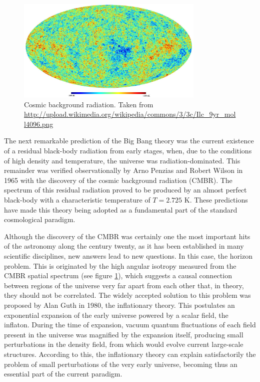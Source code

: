\
\begin{figure}[htbp]
	\centering
	\includegraphics[width=0.8\textwidth]
	{./figures/1_introduction/CMB.png}
	
	\caption{\small{Cosmic background radiation. Taken from 
	\url{http://upload.wikimedia.org/wikipedia/commons/3/3c/Ilc_9yr_moll4096.png}}}
	
	\label{fig:CMB}
\end{figure}


The next remarkable prediction of the Big Bang theory was the current 
existence of a residual black-body radiation from early stages, when,
due to the conditions of high density and temperature, the universe was 
radiation-dominated. This remainder was verified observationally by Arno 
Penzias and Robert Wilson in 1965 with the discovery of the cosmic 
background radiation (CMBR). The spectrum of this residual radiation proved 
to be produced by an almost perfect black-body with a characteristic 
temperature of  $T = 2.725$ K. These predictions have made this theory 
being adopted as a fundamental part of the standard cosmological paradigm.


Although the discovery of the CMBR was certainly one the most important 
hits of the astronomy along the century twenty, as it has been established 
in many scientific disciplines, new answers lead to new questions. In this 
case, the horizon problem. This is originated by the high angular isotropy 
measured from the CMBR spatial spectrum (see figure \ref{fig:CMB}), which 
suggests a causal connection between regions of the universe very far apart 
from each other that, in theory, they should not be correlated. The widely 
accepted solution to this problem was proposed by Alan Guth in 1980, the 
inflationary theory. This postulates an exponential expansion of the early 
universe powered by a scalar field, the inflaton. During the time of 
expansion, vacuum quantum fluctuations of each field present in the 
universe was magnified by the expansion itself, producing small 
perturbations in the density field, from which would evolve current 
large-scale structures. According to this, the inflationary theory can 
explain satisfactorily the problem of small perturbations of the very 
early universe, becoming thus an essential part of the current paradigm. 


